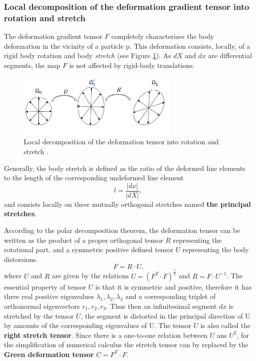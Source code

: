 \subsubsection*{Local decomposition of the deformation gradient tensor into rotation and stretch}\label{deformationgradienttensor}
The deformation gradient tensor $F$ completely characterizes
the body deformation in the vicinity of a particle p. This deformation consists, locally, of a rigid body rotation and body \textit{stretch} (see Figure \ref{deformationGradientDecom}). As $dX$ and $dx$ are differential segments, the map $F$ is not affected by rigid-body translations.  

\begin{figure}
\centering
\includegraphics[width=0.7\textwidth,keepaspectratio]{figures/deformationTensorDecomposition.png} 
\caption[]{Local decomposition of the deformation tensor into rotation and stretch .  }
\label{deformationGradientDecom}
\end{figure}

Generally, the body stretch is defined as the ratio of the deformed line elements to the length of the corresponding undeformed line element 
\begin{equation}
l = \frac{\vert dx \vert}{\vert dX \vert},
\end{equation} 
and consists locally on three mutually orthogonal stretches named \textbf{the principal stretches}.

According to the polar decomposition theorem, the deformation tensor can be written as the product of a proper orthogonal tensor $R$ representing the rotational part, and a symmetric positive defined tensor $U$ representing the body distorsions. 
\begin{equation}
F = R \cdot U.
\end{equation}
where $U$ and $R$ are given by the relations $U = (F^T \cdot F)^ {\frac{1}{2}} $ and $R = F \cdot U^{-1}$. The essential property of tensor $U$ is that it is symmetric and positive, therefore it has three real positive eigenvalues
$\lambda_1, \lambda_2, \lambda_3$ and a corresponding triplet of orthonormal eigenvectors $r_1, r_2, r_3$. Thus then an infinitesimal segment $dx$ is stretched by the tensor $U$, the segment is distorted in the principal direction of U by amounts of the corresponding eigenvalues of U. The tensor $U$ is also called the \textbf{right stretch tensor}.  Since there is a one-to-one relation between $U$ ans $U^2$, for the simplification of numerical calculus the stretch tensor can by replaced by the \textbf{Green deformation tensor} $C = F^T \cdot F$.



